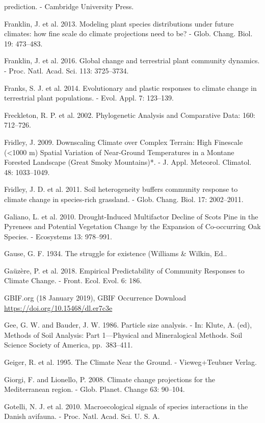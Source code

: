 \documentclass[11pt,twoside]{reedthesis}
\begin{document}
prediction. - Cambridge University Press.\par
Franklin, J. et al. 2013. Modeling plant species distributions under
future climates: how fine scale do climate projections need to be? -
Glob. Chang. Biol. 19: 473--483.\par
Franklin, J. et al. 2016. Global change and terrestrial plant community
dynamics. - Proc. Natl. Acad. Sci. 113: 3725--3734.\par
Franks, S. J. et al. 2014. Evolutionary and plastic responses to climate
change in terrestrial plant populations. - Evol. Appl. 7: 123--139.\par
Freckleton, R. P. et al. 2002. Phylogenetic Analysis and Comparative
Data: 160: 712--726.\par
Fridley, J. 2009. Downscaling Climate over Complex Terrain: High
Finescale (\textless{}1000 m) Spatial Variation of Near-Ground
Temperatures in a Montane Forested Landscape (Great Smoky Mountains)*. -
J. Appl. Meteorol. Climatol. 48: 1033--1049.\par
Fridley, J. D. et al. 2011. Soil heterogeneity buffers community
response to climate change in species-rich grassland. - Glob. Chang.
Biol. 17: 2002--2011.\par
Galiano, L. et al. 2010. Drought-Induced Multifactor Decline of Scots
Pine in the Pyrenees and Potential Vegetation Change by the Expansion of
Co-occurring Oak Species. - Ecosystems 13: 978--991.\par
Gause, G. F. 1934. The struggle for existence (Williams \& Wilkin,
Ed..\par
Gaüzère, P. et al. 2018. Empirical Predictability of Community Responses
to Climate Change. - Front. Ecol. Evol. 6: 186.\par
GBIF.org (18 January 2019), GBIF Occurrence Download
\url{https://doi.org/10.15468/dl.er7c3e} \par
Gee, G. W. and Bauder, J. W. 1986. Particle size analysis. - In: Klute,
A. (ed), Methods of Soil Analysis: Part 1---Physical and Mineralogical
Methods. Soil Science Society of America, pp.~383--411.\par
Geiger, R. et al. 1995. The Climate Near the Ground. - Vieweg+Teubner
Verlag.\par
Giorgi, F. and Lionello, P. 2008. Climate change projections for the
Mediterranean region. - Glob. Planet. Change 63: 90--104.\par
Gotelli, N. J. et al. 2010. Macroecological signals of species
interactions in the Danish avifauna. - Proc. Natl. Acad. Sci. U. S. A.
\end{document}

